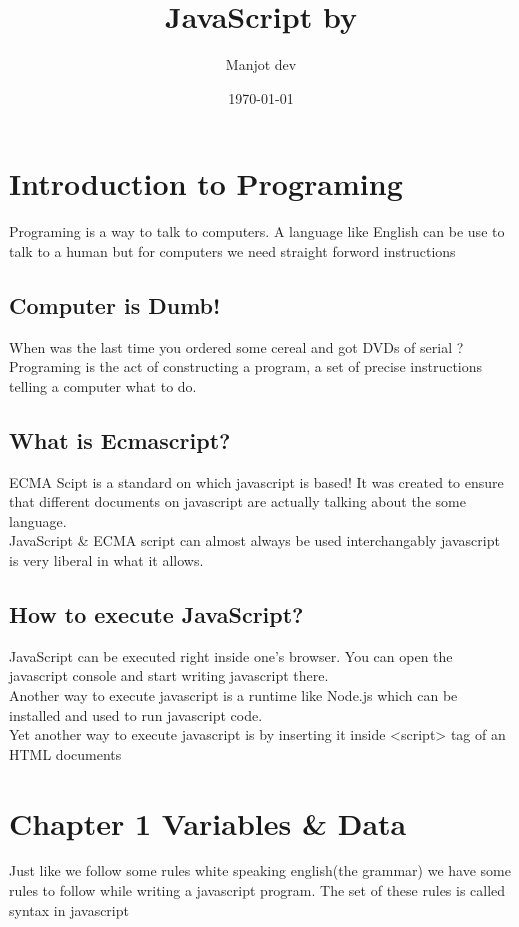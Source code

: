 \documentclass[11pt]{article}
\author{Manjot dev}
\date{\today}
\title{JavaScript by}
\begin{document}
\maketitle
\section*{Introduction to Programing}
\label{sec:orgf030484}
Programing is a  way to talk to computers. A language like  English can be use to  talk to a human but for computers  we need straight forword instructions
\subsection*{Computer is Dumb!}
\label{sec:org6541831}
When was the last time you ordered some cereal and got DVDs of serial ? \\
Programing is the act of constructing a program, a set of precise instructions telling a computer what to do.
\subsection*{What is Ecmascript?}
\label{sec:orgacdc791}
ECMA Scipt is a standard on which javascript is based!
It was created to ensure that different documents on javascript are actually talking about the some language. \\
JavaScript \& ECMA script can almost always be used interchangably javascript  is very liberal  in what it allows.
\subsection*{How to execute JavaScript?}
\label{sec:orgb5f2b29}
JavaScript can be executed right inside one's browser. You can open the javascript console and start writing javascript there. \\
Another way to execute javascript is a runtime like Node.js which can be installed and used to run javascript code. \\
Yet another way to execute javascript is by inserting it inside <script> tag of an HTML documents

\newpage
\section*{Chapter 1 Variables \& Data}
\label{sec:org39af3bf}
Just like we follow some rules white speaking english(the grammar) we have some rules to follow while writing a javascript program. The set of these rules is called syntax in javascript
\end{document}

